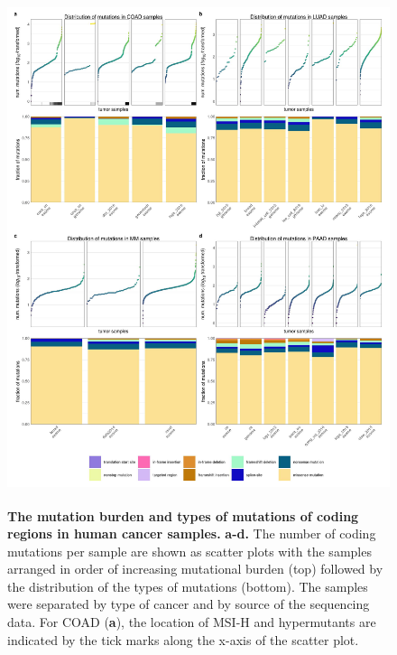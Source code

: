 \documentclass[english, 10pt, letterpaper]{article}
\begin{document}
\begin{figure}[p]
\centering
\includegraphics[height=150mm]{figures/SuppFigure_04.jpeg}
\caption{
    \textbf{The mutation burden and types of mutations of coding regions in human cancer samples.}
    \textbf{a-d.} The number of coding mutations per sample are shown as scatter plots with the samples arranged in order of increasing mutational burden (top) followed by the distribution of the types of mutations (bottom). The samples were separated by type of cancer and by source of the sequencing data.
    For COAD (\textbf{a}), the location of MSI-H and hypermutants are indicated by the tick marks along the x-axis of the scatter plot.
}
\label{sfig:mutation-burden-of-cancer-samples}
\end{figure}
\end{document}
